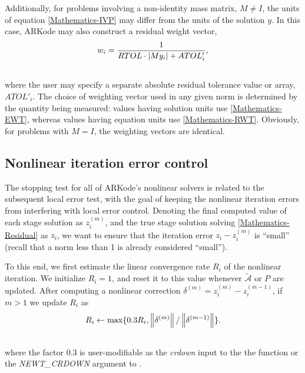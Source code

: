 \documentclass[letterpaper,10pt,english]{sphinxmanual}
\begin{document}
Additionally, for problems involving a non-identity mass matrix,
$M\ne I$, the units of equation \eqref{Mathematics-IVP} may differ from the
units of the solution $y$.  In this case, ARKode may also
construct a residual weight vector,
\label{Mathematics:equation-RWT}\begin{gather}
\begin{split}w_i = \frac{1}{RTOL\cdot |My_i| + ATOL'_i},\end{split}\label{Mathematics-RWT}\\\begin{split}\end{split}\notag
\end{gather}
where the user may specify a separate absolute residual tolerance
value or array, $ATOL'_i$.  The choice of weighting vector used
in any given norm is determined by the quantity being measured: values
having solution units use \eqref{Mathematics-EWT}, whereas values having equation
units use \eqref{Mathematics-RWT}.  Obviously, for problems with $M=I$, the
weighting vectors are identical.


\subsection{Nonlinear iteration error control}
\label{Mathematics:nonlinear-iteration-error-control}\label{Mathematics:mathematics-error-nonlinear}
The stopping test for all of ARKode's nonlinear solvers is related to
the subsequent local error test, with the goal of keeping the
nonlinear iteration errors from interfering with local error control.
Denoting the final computed value of each stage solution as
$z_i^{(m)}$, and the true stage solution solving \eqref{Mathematics-Residual}
as $z_i$, we want to ensure that the iteration error
$z_i - z_i^{(m)}$ is ``small'' (recall that a norm less than 1 is
already considered ``small'').

To this end, we first estimate the linear convergence rate $R_i$
of the nonlinear iteration.  We initialize $R_i=1$, and reset it
to this value whenever $\tilde{\mathcal A}$ or $P$ are
updated.  After computing a nonlinear correction $\delta^{(m)} =
z_i^{(m)} - z_i^{(m-1)}$, if $m>1$ we update $R_i$ as
\begin{gather}
\begin{split}R_i \leftarrow \max\{ 0.3 R_i, \left\|\delta^{(m)}\right\| / \left\|\delta^{(m-1)}\right\| \}.\end{split}\notag\\\begin{split}\end{split}\notag
\end{gather}
where the factor 0.3 is user-modifiable as the \emph{crdown} input to the
the function {\hyperref[c_interface/User_callable:ARKodeSetNonlinCRDown]{}} or the \emph{NEWT\_CRDOWN}
argument to {\hyperref[f_interface/Usage:f/_/FARKSETRIN]{}}.
\end{document}
